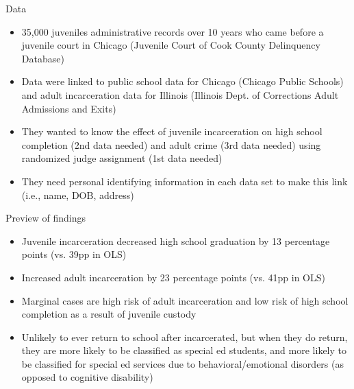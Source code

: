 \documentclass{beamer}
\begin{document}
\begin{frame}{Data}

	\begin{itemize}
	\item 35,000 juveniles administrative records over 10 years who came before a juvenile court in Chicago (Juvenile Court of Cook County Delinquency Database)
	\item Data were linked to public school data for Chicago (Chicago Public Schools) and adult incarceration data for Illinois (Illinois Dept. of Corrections Adult Admissions and Exits)
	\item They wanted to know the effect of juvenile incarceration on high school completion (2nd data needed) and adult crime (3rd data needed) using randomized judge assignment (1st data needed)
	\item They need personal identifying information in each data set to make this link (i.e., name, DOB, address)
	\end{itemize}
	
\end{frame}

\begin{frame}{Preview of findings}

	\begin{itemize}
	\item Juvenile incarceration decreased high school graduation by 13 percentage points (vs. 39pp in OLS)
	\item Increased adult incarceration by 23 percentage points (vs. 41pp in OLS)
	\item Marginal cases are high risk of adult incarceration and low risk of high school completion as a result of juvenile custody
	\item Unlikely to ever return to school after incarcerated, but when they do return, they are more likely to be classified as special ed students, and more likely to be classified for special ed services due to behavioral/emotional disorders (as opposed to cognitive disability)
	\end{itemize}
	
\end{frame}
\end{document}
